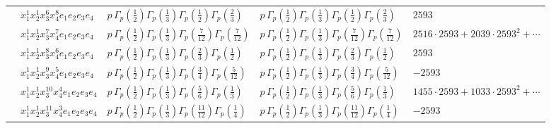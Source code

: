 \documentclass[11pt]{article}
\begin{document}
\begin{table}[ht]
{\begin{tabular}{@{}lllll@{}}
 & $x_{1}^{1} x_{2}^{1} x_{3}^{6} x_{4}^{8}  e_{1} e_{2} e_{3} e_{4}$ & $p \, \Gamma_p \left( \frac{1}{2} \right) \Gamma_p \left( \frac{1}{3} \right) \Gamma_p \left( \frac{1}{2} \right) \Gamma_p \left( \frac{2}{3} \right)$ & $p \, \Gamma_p \left( \frac{1}{2} \right) \Gamma_p \left( \frac{1}{3} \right) \Gamma_p \left( \frac{1}{2} \right) \Gamma_p \left( \frac{2}{3} \right)$ & $2593$ \\
 & $x_{1}^{1} x_{2}^{1} x_{3}^{7} x_{4}^{7}  e_{1} e_{2} e_{3} e_{4}$ & $p \, \Gamma_p \left( \frac{1}{2} \right) \Gamma_p \left( \frac{1}{3} \right) \Gamma_p \left( \frac{7}{12} \right) \Gamma_p \left( \frac{7}{12} \right)$ & $p \, \Gamma_p \left( \frac{1}{2} \right) \Gamma_p \left( \frac{1}{3} \right) \Gamma_p \left( \frac{7}{12} \right) \Gamma_p \left( \frac{7}{12} \right)$ & $2516{\cdot}2593{+}2039{\cdot}2593^{2}{+}\cdots$ \\
 & $x_{1}^{1} x_{2}^{1} x_{3}^{8} x_{4}^{6}  e_{1} e_{2} e_{3} e_{4}$ & $p \, \Gamma_p \left( \frac{1}{2} \right) \Gamma_p \left( \frac{1}{3} \right) \Gamma_p \left( \frac{2}{3} \right) \Gamma_p \left( \frac{1}{2} \right)$ & $p \, \Gamma_p \left( \frac{1}{2} \right) \Gamma_p \left( \frac{1}{3} \right) \Gamma_p \left( \frac{2}{3} \right) \Gamma_p \left( \frac{1}{2} \right)$ & $2593$ \\
 & $x_{1}^{1} x_{2}^{1} x_{3}^{9} x_{4}^{5}  e_{1} e_{2} e_{3} e_{4}$ & $p \, \Gamma_p \left( \frac{1}{2} \right) \Gamma_p \left( \frac{1}{3} \right) \Gamma_p \left( \frac{3}{4} \right) \Gamma_p \left( \frac{5}{12} \right)$ & $p \, \Gamma_p \left( \frac{1}{2} \right) \Gamma_p \left( \frac{1}{3} \right) \Gamma_p \left( \frac{3}{4} \right) \Gamma_p \left( \frac{5}{12} \right)$ & $-2593$ \\
 & $x_{1}^{1} x_{2}^{1} x_{3}^{10} x_{4}^{4}  e_{1} e_{2} e_{3} e_{4}$ & $p \, \Gamma_p \left( \frac{1}{2} \right) \Gamma_p \left( \frac{1}{3} \right) \Gamma_p \left( \frac{5}{6} \right) \Gamma_p \left( \frac{1}{3} \right)$ & $p \, \Gamma_p \left( \frac{1}{2} \right) \Gamma_p \left( \frac{1}{3} \right) \Gamma_p \left( \frac{5}{6} \right) \Gamma_p \left( \frac{1}{3} \right)$ & $1455{\cdot}2593{+}1033{\cdot}2593^{2}{+}\cdots$ \\
 & $x_{1}^{1} x_{2}^{1} x_{3}^{11} x_{4}^{3}  e_{1} e_{2} e_{3} e_{4}$ & $p \, \Gamma_p \left( \frac{1}{2} \right) \Gamma_p \left( \frac{1}{3} \right) \Gamma_p \left( \frac{11}{12} \right) \Gamma_p \left( \frac{1}{4} \right)$ & $p \, \Gamma_p \left( \frac{1}{2} \right) \Gamma_p \left( \frac{1}{3} \right) \Gamma_p \left( \frac{11}{12} \right) \Gamma_p \left( \frac{1}{4} \right)$ & $-2593$ \\

\end{tabular}}
\end{table}
\end{document}
